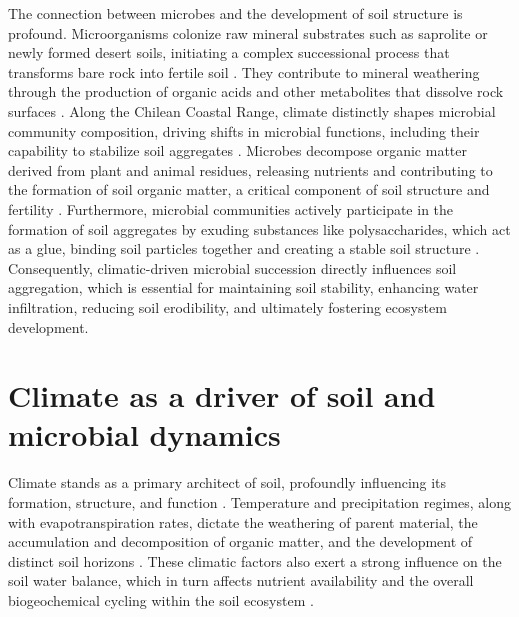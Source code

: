 The connection between microbes and the development of soil structure is profound. Microorganisms colonize raw mineral substrates such as saprolite or newly formed desert soils, initiating a complex successional process that transforms bare rock into fertile soil \citep{Lazaro2008,Stradling2002}. They contribute to mineral weathering through the production of organic acids and other metabolites that dissolve rock surfaces \citep{Bajerski2013,Mavris2010,Styriakova2012}. Along the Chilean Coastal Range, climate distinctly shapes microbial community composition, driving shifts in microbial functions, including their capability to stabilize soil aggregates \citep{Bernhard2018}. Microbes decompose organic matter derived from plant and animal residues, releasing nutrients and contributing to the formation of soil organic matter, a critical component of soil structure and fertility \citep{Bucka2019,Oades1993}. Furthermore, microbial communities actively participate in the formation of soil aggregates by exuding substances like polysaccharides, which act as a glue, binding soil particles together and creating a stable soil structure \citep{Martens1992,SchlechtPietsch1994}. Consequently, climatic-driven microbial succession directly influences soil aggregation, which is essential for maintaining soil stability, enhancing water infiltration, reducing soil erodibility, and ultimately fostering ecosystem development.

\section{Climate as a driver of soil and microbial dynamics}
\label{sec:ClimateMicrobialDynamics}

Climate stands as a primary architect of soil, profoundly influencing its formation, structure, and function \citep{Jenny1941}. Temperature and precipitation regimes, along with evapotranspiration rates, dictate the weathering of parent material, the accumulation and decomposition of organic matter, and the development of distinct soil horizons \citep{Scholten2017}. These climatic factors also exert a strong influence on the soil water balance, which in turn affects nutrient availability and the overall biogeochemical cycling within the soil ecosystem \citep{Eldridge2020}.

